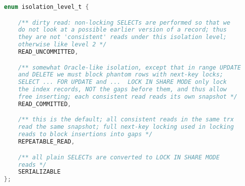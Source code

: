 \documentclass[../../../interview-questions.tex]{subfiles}
\begin{document}
\begin{lstlisting}[language=C]
enum isolation_level_t {

    /** dirty read: non-locking SELECTs are performed so that we
    do not look at a possible earlier version of a record; thus
    they are not 'consistent' reads under this isolation level;
    otherwise like level 2 */
    READ_UNCOMMITTED,

    /** somewhat Oracle-like isolation, except that in range UPDATE
    and DELETE we must block phantom rows with next-key locks;
    SELECT ... FOR UPDATE and ...  LOCK IN SHARE MODE only lock
    the index records, NOT the gaps before them, and thus allow
    free inserting; each consistent read reads its own snapshot */
    READ_COMMITTED,

    /** this is the default; all consistent reads in the same trx
    read the same snapshot; full next-key locking used in locking
    reads to block insertions into gaps */
    REPEATABLE_READ,

    /** all plain SELECTs are converted to LOCK IN SHARE MODE
    reads */
    SERIALIZABLE
};
\end{lstlisting}
\end{document}
